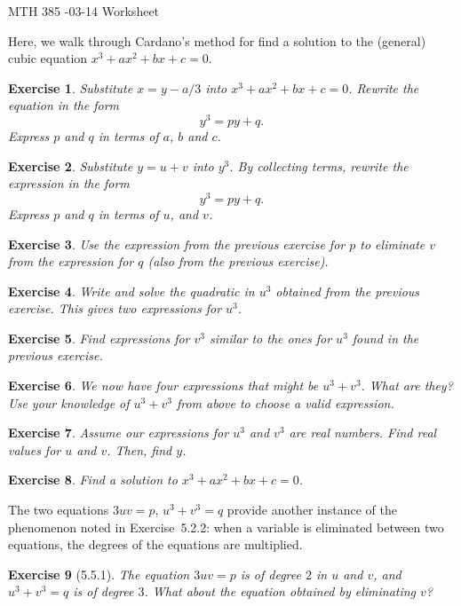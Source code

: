 \documentclass[12pt]{article}
\theoremstyle{plain}
\newtheorem{ex}{Exercise}
\begin{document}
MTH 385 -03-14 Worksheet

Here, we walk through Cardano's method for find a solution to the (general) cubic equation $x^3+ax^2+bx+c=0$.

\begin{ex}
  Substitute $x=y-a/3$ into $x^3+ax^2+bx+c=0$. Rewrite the equation in the form
  \[
    y^3=py+q.
  \]
  Express $p$ and $q$ in terms of $a$, $b$ and $c$.
\end{ex}

\begin{ex}
  Substitute $y=u+v$ into $y^3$. By collecting terms, rewrite the expression in the form
  \[
    y^3=py+q.
  \]
  Express $p$ and $q$ in terms of $u$, and $v$.
\end{ex}

\begin{ex}
  Use the expression from the previous exercise for $p$ to eliminate $v$ from the expression for $q$ (also from the previous exercise).
\end{ex}

\begin{ex}
  Write and solve the quadratic in $u^3$ obtained from the previous exercise. This gives two expressions for $u^3$.
\end{ex}

\begin{ex}
  Find expressions for $v^3$ similar to the ones for $u^3$ found in the previous exercise.
\end{ex}

\begin{ex}
  We now have four expressions that might be $u^3+v^3$. What are they? Use your knowledge of $u^3+v^3$ from above to choose a valid expression.
\end{ex}

\begin{ex}
  Assume our expressions for $u^3$ and $v^3$ are real numbers. Find real values for $u$ and $v$. Then, find $y$.
\end{ex}

\begin{ex}
  Find a solution to $x^3+ax^2+bx+c=0$.
\end{ex}

The two equations $3uv=p$, $u^3+v^3=q$ provide another instance of the phenomenon noted in Exercise~5.2.2: when a variable is eliminated between two equations, the degrees of the equations are multiplied.

\begin{ex}[5.5.1]
  The equation $3uv=p$ is of degree $2$ in $u$ and $v$, and $u^3+v^3=q$ is of degree $3$. What about the equation obtained by eliminating $v$?
\end{ex}
\end{document}

